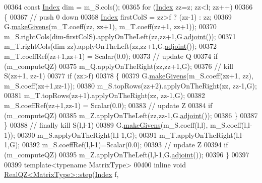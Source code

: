 \begin{DoxyCode}
00364       \textcolor{keyword}{const} \hyperlink{group___eigenvalues___module_a6201e534e901b5f4e66f72c176b534a3}{Index} dim = m\_S.cols();
00365       \textcolor{keywordflow}{for} (\hyperlink{group___eigenvalues___module_a6201e534e901b5f4e66f72c176b534a3}{Index} zz=z; zz<l; zz++)
00366       \{
00367         \textcolor{comment}{// push 0 down}
00368         \hyperlink{group___eigenvalues___module_a6201e534e901b5f4e66f72c176b534a3}{Index} firstColS = zz>f ? (zz-1) : zz;
00369         G.\hyperlink{group___jacobi___module_af73c81e9cc139b7e0d877ce553b02ec0}{makeGivens}(m\_T.coeff(zz, zz+1), m\_T.coeff(zz+1, zz+1));
00370         m\_S.rightCols(dim-firstColS).applyOnTheLeft(zz,zz+1,G.\hyperlink{group___jacobi___module_a89c8ea615f8fa77ddd5810a1e5fde4da}{adjoint}());
00371         m\_T.rightCols(dim-zz).applyOnTheLeft(zz,zz+1,G.\hyperlink{group___jacobi___module_a89c8ea615f8fa77ddd5810a1e5fde4da}{adjoint}());
00372         m\_T.coeffRef(zz+1,zz+1) = Scalar(0.0);
00373         \textcolor{comment}{// update Q}
00374         \textcolor{keywordflow}{if} (m\_computeQZ)
00375           m\_Q.applyOnTheRight(zz,zz+1,G);
00376         \textcolor{comment}{// kill S(zz+1, zz-1)}
00377         \textcolor{keywordflow}{if} (zz>f)
00378         \{
00379           G.\hyperlink{group___jacobi___module_af73c81e9cc139b7e0d877ce553b02ec0}{makeGivens}(m\_S.coeff(zz+1, zz), m\_S.coeff(zz+1,zz-1));
00380           m\_S.topRows(zz+2).applyOnTheRight(zz, zz-1,G);
00381           m\_T.topRows(zz+1).applyOnTheRight(zz, zz-1,G);
00382           m\_S.coeffRef(zz+1,zz-1) = Scalar(0.0);
00383           \textcolor{comment}{// update Z}
00384           \textcolor{keywordflow}{if} (m\_computeQZ)
00385             m\_Z.applyOnTheLeft(zz,zz-1,G.\hyperlink{group___jacobi___module_a89c8ea615f8fa77ddd5810a1e5fde4da}{adjoint}());
00386         \}
00387       \}
00388       \textcolor{comment}{// finally kill S(l,l-1)}
00389       G.\hyperlink{group___jacobi___module_af73c81e9cc139b7e0d877ce553b02ec0}{makeGivens}(m\_S.coeff(l,l), m\_S.coeff(l,l-1));
00390       m\_S.applyOnTheRight(l,l-1,G);
00391       m\_T.applyOnTheRight(l,l-1,G);
00392       m\_S.coeffRef(l,l-1)=Scalar(0.0);
00393       \textcolor{comment}{// update Z}
00394       \textcolor{keywordflow}{if} (m\_computeQZ)
00395         m\_Z.applyOnTheLeft(l,l-1,G.\hyperlink{group___jacobi___module_a89c8ea615f8fa77ddd5810a1e5fde4da}{adjoint}());
00396     \}
00397 
00399   \textcolor{keyword}{template}<\textcolor{keyword}{typename} MatrixType>
00400     \textcolor{keyword}{inline} \textcolor{keywordtype}{void} \hyperlink{group___eigenvalues___module_class_eigen_1_1_real_q_z}{RealQZ<MatrixType>::step}(\hyperlink{group___eigenvalues___module_a6201e534e901b5f4e66f72c176b534a3}{Index} f, 

\end{DoxyCode}
